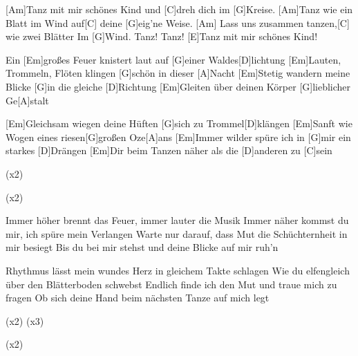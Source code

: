 


\begin{guitar}
	[Am]Tanz mit mir schönes Kind und [C]dreh dich im [G]Kreise.
	[Am]Tanz wie ein Blatt im Wind auf[C] deine [G]eig'ne Weise.
	[Am] Lass uns zusammen tanzen,[C] wie zwei Blätter
	Im [G]Wind. Tanz! Tanz! [E]Tanz mit mir schönes Kind!
	
	
	Ein [Em]großes Feuer knistert laut auf [G]einer Waldes[D]lichtung
	[Em]Lauten, Trommeln, Flöten klingen [G]schön in dieser [A]Nacht
	[Em]Stetig wandern meine Blicke [G]in die gleiche [D]Richtung
	[Em]Gleiten über deinen Körper [G]lieblicher Ge[A]stalt
	
	[Em]Gleichsam wiegen deine Hüften [G]sich zu Trommel[D]klängen
	[Em]Sanft wie Wogen eines riesen[G]großen Oze[A]ans
	[Em]Immer wilder spüre ich in [G]mir ein starkes [D]Drängen
	[Em]Dir beim Tanzen näher als die [D]anderen zu [C]sein

	  (x2)
	
	 (x2)
	
	Immer höher brennt das Feuer, immer lauter die Musik
	Immer näher kommst du mir, ich spüre mein Verlangen
	Warte nur darauf, dass Mut die Schüchternheit in mir besiegt
	Bis du bei mir stehst und deine Blicke auf mir ruh'n
	
	Rhythmus lässt mein wundes Herz in gleichem Takte schlagen
	Wie du elfengleich über den Blätterboden schwebst
	Endlich finde ich den Mut und traue mich zu fragen
	Ob sich deine Hand beim nächsten Tanze auf mich legt

	  (x2)
	\pagebreak
	 (x3)
	
	  (x2)
	

\end{guitar}
